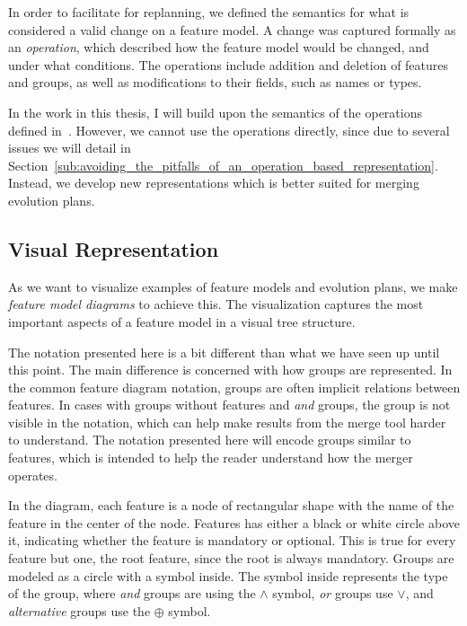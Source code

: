 \documentclass[a4paper,english]{ifimaster}
\begin{document}
In order to facilitate for replanning, we defined the semantics for what is considered a valid change on a feature model. A change was captured formally as an \textit{operation}, which described how the feature model would be changed, and under what conditions. The operations include addition and deletion of features and groups, as well as modifications to their fields, such as names or types.

In the work in this thesis, I will build upon the semantics of the operations defined in~\cite{cite:consistency_preserving_evolution_planning}. However, we cannot use the operations directly, since due to several issues we will detail in Section~\vref{sub:avoiding_the_pitfalls_of_an_operation_based_representation}. Instead, we develop new representations which is better suited for merging evolution plans.

\subsection{Visual Representation}%
\label{sub:visual_representation}

As we want to visualize examples of feature models and evolution plans, we make \textit{feature model diagrams} to achieve this. The visualization captures the most important aspects of a feature model in a visual tree structure. 

The notation presented here is a bit different than what we have seen up until this point. The main difference is concerned with how groups are represented. In the common feature diagram notation, groups are often implicit relations between features. In cases with groups without features and \textit{and} groups, the group is not visible in the notation, which can help make results from the merge tool harder to understand. The notation presented here will encode groups similar to features, which is intended to help the reader understand how the merger operates.

In the diagram, each feature is a node of rectangular shape with the name of the feature in the center of the node. Features has either a black or white circle above it, indicating whether the feature is mandatory or optional. This is true for every feature but one, the root feature, since the root is always mandatory. Groups are modeled as a circle with a symbol inside. The symbol inside represents the type of the group, where \textit{and} groups are using the $\land$ symbol, \textit{or} groups use $\lor$, and \textit{alternative} groups use the $\oplus$ symbol.
\end{document}
